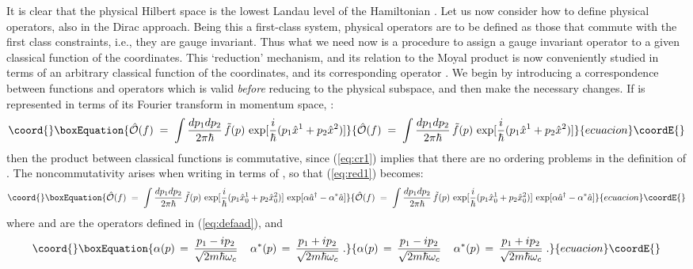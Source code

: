\documentclass[a4paper,12pt]{article}
\begin{document}
It is clear that the physical Hilbert space is the lowest Landau
level
of the Hamiltonian \coordHE{}. Let us now consider how to define
physical operators, also in the Dirac approach. Being this a
first-class system, physical operators are to be defined as those
that
commute with the first class constraints, i.e., they are gauge
invariant. Thus what we need now is a procedure to assign a gauge
invariant operator to a given classical function of the
coordinates.
This `reduction' mechanism, and its relation to the Moyal product
is
now conveniently studied in terms of an arbitrary classical
function
\coordHE{} of the coordinates, and its corresponding operator
\coordHE{}.  We begin by introducing a correspondence between
functions
and operators which is valid {\em before\/} reducing to the
physical
subspace, and then make the necessary changes. If \coordHE{} is
represented in terms of its Fourier transform in momentum space,
\coordHE{}:
\begin{equation}\coord{}\boxEquation{
  \label{eq:red1}
{\hat {\mathcal O}}(f)\;=\; \int \frac{dp_1 dp_2}{2\pi \hbar}\,
{\tilde f}(p) \, \exp [ \frac{i}{\hbar} (p_1 {\hat x}^1 + p_2 {\hat
x}^2)]
}{
  {\hat {\mathcal O}}(f)\;=\; \int \frac{dp_1 dp_2}{2\pi \hbar}\,
{\tilde f}(p) \, \exp [ \frac{i}{\hbar} (p_1 {\hat x}^1 + p_2 {\hat
x}^2)]
}{ecuacion}\coordE{}\end{equation}
then the product between classical functions is commutative, since
(\ref{eq:cr1}) implies that there are no ordering problems in the
definition of \coordHE{}.  The noncommutativity arises
when writing \coordHE{} in terms of \coordHE{}, so that
(\ref{eq:red1}) becomes:
\begin{equation}\coord{}\boxEquation{
  \label{eq:red2}
{\hat {\mathcal O}}(f)\;=\; \int \frac{dp_1 dp_2}{2\pi \hbar}\,
{\tilde f}(p) \, \exp [ \frac{i}{\hbar} (p_1 {\hat x}^1_0 + p_2
{\hat x}^2_0)]
\, \exp [ \alpha {\hat a}^\dagger - \alpha^* {\hat a} ]
}{
  {\hat {\mathcal O}}(f)\;=\; \int \frac{dp_1 dp_2}{2\pi \hbar}\,
{\tilde f}(p) \, \exp [ \frac{i}{\hbar} (p_1 {\hat x}^1_0 + p_2
{\hat x}^2_0)]
\, \exp [ \alpha {\hat a}^\dagger - \alpha^* {\hat a} ]
}{ecuacion}\coordE{}\end{equation}
where \coordHE{} and \coordHE{} are the operators defined
in
(\ref{eq:defaad}), and
\begin{equation}\coord{}\boxEquation{
  \label{eq:red3}
\alpha(p) \,=\,\frac{p_1 - i p_2}{\sqrt{2 m \hbar \omega_c}}
\;\;\;\;
\alpha^*(p) \,=\,\frac{p_1 + i p_2}{\sqrt{2 m \hbar \omega_c}} \;.
}{
  \alpha(p) \,=\,\frac{p_1 - i p_2}{\sqrt{2 m \hbar \omega_c}}
\;\;\;\;
\alpha^*(p) \,=\,\frac{p_1 + i p_2}{\sqrt{2 m \hbar \omega_c}} \;.
}{ecuacion}\coordE{}\end{equation}
\end{document}
